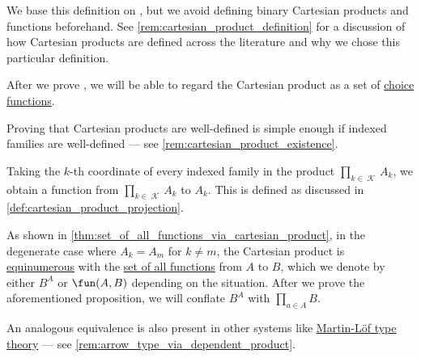 \begin{comments}
  \item We base this definition on \cite[36]{Halmos1960NaiveSetTheory}, but we avoid defining binary Cartesian products and functions beforehand. See \cref{rem:cartesian_product_definition} for a discussion of how Cartesian products are defined across the literature and why we chose this particular definition.

  \item After we prove , we will be able to regard the Cartesian product as a set of \hyperref[def:choice_function]{choice functions}.

  \item Proving that Cartesian products are well-defined is simple enough if indexed families are well-defined --- see \cref{rem:cartesian_product_existence}.

  \item Taking the \( k \)-th coordinate of every indexed family in the product \( \prod_{k \in \mscrK} A_k \), we obtain a function from \( \prod_{k \in \mscrK} A_k \) to \( A_k \). This is defined as discussed in \cref{def:cartesian_product_projection}.

  \item As shown in \cref{thm:set_of_all_functions_via_cartesian_product}, in the degenerate case where \( A_k = A_m \) for \( k \neq m \), the Cartesian product is \hyperref[def:equinumerosity]{equinumerous} with the \hyperref[def:set_of_all_functions]{set of all functions} from \( A \) to \( B \), which we denote by either \( B^A \) or \( \fun(A, B) \) depending on the situation. After we prove the aforementioned proposition, we will conflate \( B^A \) with \( \prod_{a \in A} B \).

  An analogous equivalence is also present in other systems like \hyperref[def:martin_lof_type_theory]{Martin-L\"of type theory} --- see \cref{rem:arrow_type_via_dependent_product}.
\end{comments}

